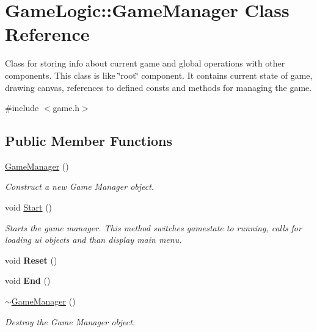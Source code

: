 \hypertarget{classGameLogic_1_1GameManager}{}\section{Game\+Logic\+:\+:Game\+Manager Class Reference}
\label{classGameLogic_1_1GameManager}


Class for storing info about current game and global operations with other components. This class is like \char`\"{}root\char`\"{} component. It contains current state of game, drawing canvas, references to defined consts and methods for managing the game.  




{\ttfamily \#include $<$game.\+h$>$}

\subsection*{Public Member Functions}
\begin{DoxyCompactItemize}
\item 
\mbox{\label{classGameLogic_1_1GameManager_a95991c690344ced051177ead6e2d9514}} 
\hyperlink{classGameLogic_1_1GameManager_a95991c690344ced051177ead6e2d9514}{Game\+Manager} ()
\begin{DoxyCompactList}\small\item\em Construct a new Game Manager object. \end{DoxyCompactList}\item 
\mbox{\label{classGameLogic_1_1GameManager_a62bf876ca6a83a050b4b9af2395a56ed}} 
void \hyperlink{classGameLogic_1_1GameManager_a62bf876ca6a83a050b4b9af2395a56ed}{Start} ()
\begin{DoxyCompactList}\small\item\em Starts the game manager. This method switches gamestate to running, calls for loading ui objects and than display main menu. \end{DoxyCompactList}\item 
\mbox{\label{classGameLogic_1_1GameManager_a7bf14092b434761c7fd1b5d511647c4b}} 
void {\bfseries Reset} ()
\item 
\mbox{\label{classGameLogic_1_1GameManager_a508ca7605955698bdfe0d6ae3cd8984d}} 
void {\bfseries End} ()
\item 
\mbox{\label{classGameLogic_1_1GameManager_ac031675d3fb3b515d32c4cfa66082eb7}} 
\hyperlink{classGameLogic_1_1GameManager_ac031675d3fb3b515d32c4cfa66082eb7}{$\sim$\+Game\+Manager} ()
\begin{DoxyCompactList}\small\item\em Destroy the Game Manager object. \end{DoxyCompactList}\end{DoxyCompactItemize}


